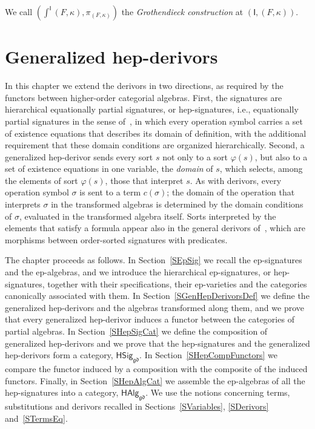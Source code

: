 \documentclass[a4paper, reqno]{amsbook}
\newcommand{\gd}{\mathfrak{gd}}              %
\theoremstyle{plain}
\theoremstyle{definition}
\begin{document}
We call $(\int^{\mathsf{I}}(F,\kappa),\pi_{(F,\kappa)})$ the \emph{Grothendieck construction} at $(\mathsf{I},(F,\kappa))$.

\chapter{Generalized hep-derivors}\label{SGenHepDerivors}

In this chapter we extend the derivors in two directions, as required by the functors between higher-order categorial algebras.
First, the signatures are hierarchical equationally partial signatures, or hep-signatures, i.e., equationally partial signatures in the sense of~\cite{Reichel1987}, in which every operation symbol carries a set of existence equations that describes its domain of definition, with the additional requirement that these domain conditions are organized hierarchically.
Second, a generalized hep-derivor sends every sort $s$ not only to a sort $\varphi(s)$, but also to a set of existence equations in one variable, the \emph{domain} of $s$, which selects, among the elements of sort $\varphi(s)$, those that interpret $s$.
As with derivors, every operation symbol $\sigma$ is sent to a term $c(\sigma)$; the domain of the operation that interprets $\sigma$ in the transformed algebras is determined by the domain conditions of $\sigma$, evaluated in the transformed algebra itself.
Sorts interpreted by the elements that satisfy a formula appear also in the general derivors of~\cite{LucasGutierrez2018}, which are morphisms between order-sorted signatures with predicates.

The chapter proceeds as follows.
In Section~\ref{SEpSig} we recall the ep-signatures and the ep-algebras, and we introduce the hierarchical ep-signatures, or hep-signatures, together with their specifications, their ep-varieties and the categories canonically associated with them.
In Section~\ref{SGenHepDerivorsDef} we define the generalized hep-derivors and the algebras transformed along them, and we prove that every generalized hep-derivor induces a functor between the categories of partial algebras.
In Section~\ref{SHepSigCat} we define the composition of generalized hep-derivors and we prove that the hep-signatures and the generalized hep-derivors form a category, $\mathsf{HSig}_{\gd}$.
In Section~\ref{SHepCompFunctors} we compare the functor induced by a composition with the composite of the induced functors.
Finally, in Section~\ref{SHepAlgCat} we assemble the ep-algebras of all the hep-signatures into a category, $\mathsf{HAlg}_{\gd}$.
We use the notions concerning terms, substitutions and derivors recalled in Sections~\ref{SVariables}, \ref{SDerivors} and~\ref{STermsEq}.
\end{document}
